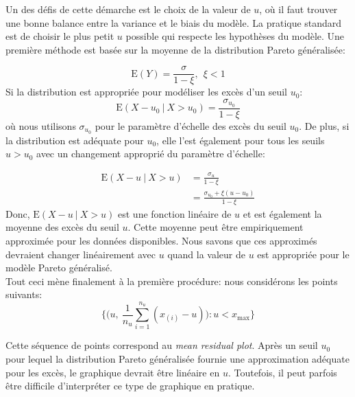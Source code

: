 \documentclass[11pt]{report}
\numberwithin{equation}{section}
\begin{document}
Un des défis de cette démarche est le choix de la valeur de $u$, où il faut trouver une bonne balance entre la variance et le biais du modèle. La pratique standard est de choisir le plus petit $u$ possible qui respecte les hypothèses du modèle. Une première méthode est basée sur la moyenne de la distribution Pareto généralisée:

\begin{equation}\label{eq:1.2.2}
{\text{E}(Y) = \frac{\sigma}{1-\xi},\ \ \xi <1}
\end{equation}
Si la distribution est appropriée pour modéliser les excès d'un seuil $u_0$:
\begin{equation}\label{eq:1.2.3}
{\text{E}(X-u_0\ |\ X>u_0) = \frac{\sigma_{u_{0}}}{1- \xi}}
\end{equation}
où nous utilisons $\sigma_{u_{0}}$ pour le paramètre d'échelle des excès du seuil $u_0$. De plus, si la distribution est adéquate pour $u_0$, elle l'est également pour tous les seuils $u>u_0$ avec un changement approprié du paramètre d'échelle:

\begin{equation}\label{eq:1.2.4}
\begin{split}
\text{E}(X-u\ |\ X>u) &= {\frac{\sigma_u}{1-\xi}}\\
    &= {\frac{\sigma_{u_0} + \xi{(u-u_0)}}{1-\xi}}
\end{split}
\end{equation}
Donc, $\text{E}(X-u\ |\ X>u)$ est une fonction linéaire de $u$ et est également la moyenne des excès du seuil $u$. Cette moyenne peut être empiriquement approximée pour les données disponibles. Nous savons que ces approximés devraient changer linéairement avec $u$ quand la valeur de $u$ est appropriée pour le modèle Pareto généralisé. \\

Tout ceci mène finalement à la première procédure: nous considérons les points suivants:
\begin{equation}\label{eq:1.2.5}
\Bigg\{\Bigg(u,\ \frac{1}{n_u}\sum_{i=1}^{n_u}(x_{(i)} - u) \Bigg): u<x_{\text{max}}  \Bigg\}
\end{equation}

Cette séquence de points correspond au \textit{mean residual plot}. Après un seuil $u_0$ pour lequel la distribution Pareto généralisée fournie une approximation adéquate pour les excès, le graphique devrait être linéaire en $u$. Toutefois, il peut parfois être difficile d'interpréter ce type de graphique en pratique. \\
\end{document}
